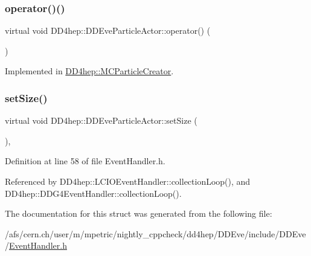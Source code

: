 \subsubsection{\texorpdfstring{operator()()}{operator()()}}
{\footnotesize\ttfamily virtual void D\+D4hep\+::\+D\+D\+Eve\+Particle\+Actor\+::operator() (\begin{DoxyParamCaption}\item[{const \hyperlink{class_d_d4hep_1_1_d_d_eve_particle}{D\+D\+Eve\+Particle} \&}]{ }\end{DoxyParamCaption})\hspace{0.3cm}{\ttfamily [pure virtual]}}



Implemented in \hyperlink{struct_d_d4hep_1_1_m_c_particle_creator_a42ebf0f3d55a5f02d9617ccf7aaf550a}{D\+D4hep\+::\+M\+C\+Particle\+Creator}.

\hypertarget{struct_d_d4hep_1_1_d_d_eve_particle_actor_ac272c9587190181a943894d5983b1ac9}{}\label{struct_d_d4hep_1_1_d_d_eve_particle_actor_ac272c9587190181a943894d5983b1ac9} 
\subsubsection{\texorpdfstring{set\+Size()}{setSize()}}
{\footnotesize\ttfamily virtual void D\+D4hep\+::\+D\+D\+Eve\+Particle\+Actor\+::set\+Size (\begin{DoxyParamCaption}\item[{size\+\_\+t}]{ }\end{DoxyParamCaption})\hspace{0.3cm}{\ttfamily [inline]}, {\ttfamily [virtual]}}



Definition at line 58 of file Event\+Handler.\+h.



Referenced by D\+D4hep\+::\+L\+C\+I\+O\+Event\+Handler\+::collection\+Loop(), and D\+D4hep\+::\+D\+D\+G4\+Event\+Handler\+::collection\+Loop().



The documentation for this struct was generated from the following file\+:\begin{DoxyCompactItemize}
\item 
/afs/cern.\+ch/user/m/mpetric/nightly\+\_\+cppcheck/dd4hep/\+D\+D\+Eve/include/\+D\+D\+Eve/\hyperlink{_event_handler_8h}{Event\+Handler.\+h}\end{DoxyCompactItemize}
